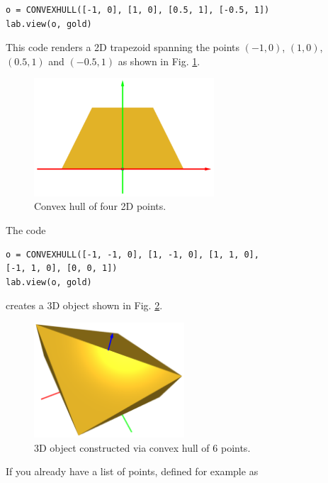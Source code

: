 \begin{bbox}
\begin{verbatim}
o = CONVEXHULL([-1, 0], [1, 0], [0.5, 1], [-0.5, 1])
lab.view(o, gold)
\end{verbatim}
\end{bbox}
\vspace{6mm}

\noindent
This code renders a 2D trapezoid spanning the points $(-1, 0)$, $(1, 0)$, $(0.5, 1)$ and 
$(-0.5, 1)$ as shown in Fig. \ref{fig:ch-111}.

\begin{figure}[!ht]
\begin{center}
\includegraphics[width=0.6\textwidth]{img/ch-111.png}
\end{center}
\vspace{-4mm}
\caption{Convex hull of four 2D points.}
\label{fig:ch-111}
\end{figure}
\noindent
The code\\

\begin{bbox}
\begin{verbatim}
o = CONVEXHULL([-1, -1, 0], [1, -1, 0], [1, 1, 0], 
[-1, 1, 0], [0, 0, 1])
lab.view(o, gold)
\end{verbatim}
\end{bbox}
\vspace{6mm}

\noindent
creates a 3D object shown in Fig. \ref{fig:pyra}. 

\begin{figure}[!ht]
\begin{center}
\includegraphics[width=0.5\textwidth]{img/ch-112.png}
\end{center}
\vspace{-4mm}
\caption{3D object constructed via convex hull of 6 points.}
\label{fig:pyra}
\end{figure}
\noindent
If you already have a list of points, defined for example as\\

